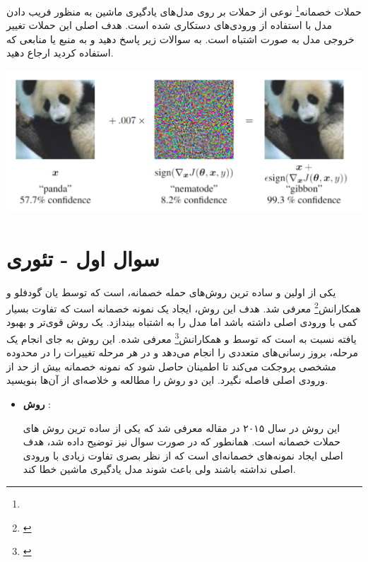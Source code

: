 حملات خصمانه\footnote{} نوعی از حملات بر روی مدل‌های یادگیری ماشین به منظور فریب دادن مدل با استفاده از ورودی‌های دستکاری شده است. هدف اصلی این حملات تغییر خروجی مدل به صورت اشتباه است. به سوالات زیر پاسخ دهید و به منبع یا منابعی که استفاده کردید ارجاع دهید.


\begin{center}
	\includegraphics*[width=0.8\linewidth]{pics/img1.png}
	\label{تغییر نمونه ورودی}
\end{center}


\section{سوال اول - تئوری}
یکی از اولین و ساده ترین روش‌های حمله خصمانه،  است که توسط یان گودفلو و همکارانش\footnote{‬‬} معرفی شد. هدف این روش، ایجاد یک نمونه خصمانه است که تفاوت بسیار کمی با ورودی اصلی داشته باشد اما مدل را به اشتباه بیندازد.  یک روش قوی‌تر و بهبود یافته نسبت به  است که توسط  و همکارانش\footnote{‫‪‬‬} معرفی شده. این روش به جای انجام یک مرحله، بروز رسانی‌های متعددی را انجام می‌دهد و در هر مرحله تغییرات را در محدوده مشخصی پروجکت می‌کند تا اطمینان حاصل شود که نمونه خصمانه بیش از حد از ورودی اصلی فاصله نگیرد. این دو روش را مطالعه و خلاصه‌ای از آن‌ها بنویسید.


\begin{qsolve}
	\begin{itemize}
		\item \textbf{روش }:
		
		این روش در سال ۲۰۱۵ در مقاله  معرفی شد که یکی از ساده ترین روش های حملات خصمانه است. همانطور که در صورت سوال نیز توضیح داده شد، هدف اصلی  ایجاد نمونه‌های خصمانه‌ای است که از نظر بصری تفاوت زیادی با ورودی اصلی نداشته باشند ولی باعث شوند مدل یادگیری ماشین خطا کند.
	\end{itemize}
\end{qsolve}


